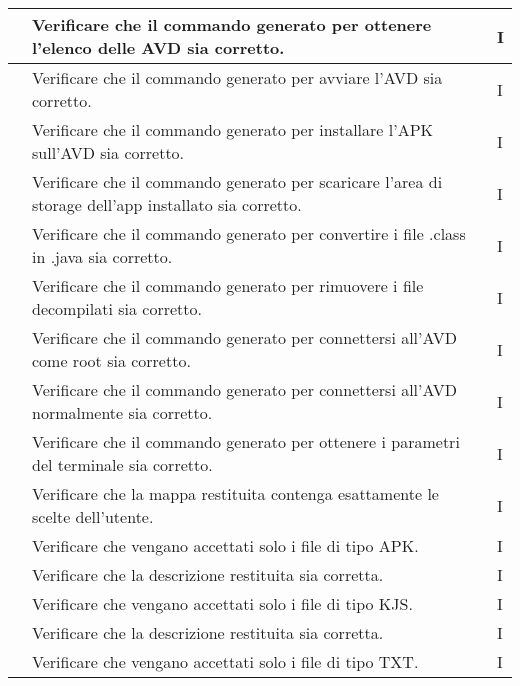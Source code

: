 \begin{center}
\begin{longtable}{ |C{3cm} | C{8.5cm}| C{1.5cm} |}
         & Verificare che il commando generato per ottenere l'elenco delle AVD sia corretto.                       & I \\\hline
         & Verificare che il commando generato per avviare l'AVD sia corretto.                                     & I \\\hline
         & Verificare che il commando generato per installare l'APK sull'AVD sia corretto.                         & I \\\hline
         & Verificare che il commando generato per scaricare l'area di storage dell'app installato sia corretto.   & I \\\hline
         & Verificare che il commando generato per convertire i file .class in .java sia corretto.                 & I \\\hline
         & Verificare che il commando generato per rimuovere i file decompilati sia corretto.                      & I \\\hline
         & Verificare che il commando generato per connettersi all'AVD come root sia corretto.                     & I \\\hline
         & Verificare che il commando generato per connettersi all'AVD normalmente sia corretto.                   & I \\\hline
         & Verificare che il commando generato per ottenere i parametri del terminale sia corretto.                & I \\\hline
         & Verificare che la mappa restituita contenga esattamente le scelte dell'utente.                          & I \\\hline
         & Verificare che vengano accettati solo i file di tipo APK.                                               & I \\\hline
         & Verificare che la descrizione restituita sia corretta.                                                  & I \\\hline
         & Verificare che vengano accettati solo i file di tipo KJS.                                               & I \\\hline
         & Verificare che la descrizione restituita sia corretta.                                                  & I \\\hline
         & Verificare che vengano accettati solo i file di tipo TXT.                                               & I \\\hline

\end{longtable}
\end{center}
